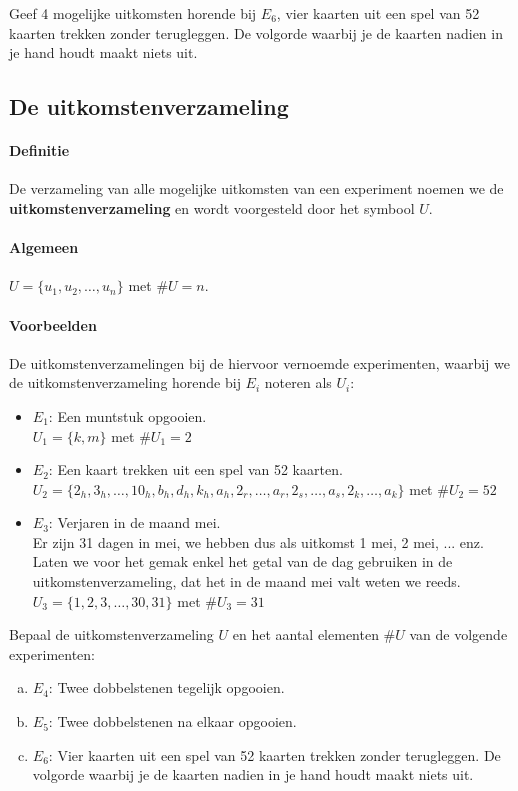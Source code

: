 \documentclass[12pt,twoside]{article}
\begin{document}
\begin{oefening}
Geef 4 mogelijke uitkomsten horende bij $E_6$, vier kaarten uit een spel van 52 kaarten trekken zonder terugleggen. De volgorde waarbij je de kaarten nadien in je hand houdt maakt niets uit.
\end{oefening}

\subsection{De uitkomstenverzameling}

\paragraph*{Definitie}
De verzameling van alle mogelijke uitkomsten van een experiment noemen we de
{\bf uitkomstenverzameling} en wordt voorgesteld door het symbool $U$.

\paragraph*{Algemeen}
$U=\{u_1, u_2, \ldots, u_n\}$ met $\#U=n$.

\paragraph*{Voorbeelden} De uitkomstenverzamelingen bij de hiervoor vernoemde experimenten, waarbij we de uitkomstenverzameling horende bij $E_i$ noteren als $U_i$:
\begin{itemize}
  \item $E_1$: Een muntstuk opgooien.\\
  $U_1 = \{k,m\}$ met $\#U_1=2$
  \item $E_2$: Een kaart trekken uit een spel van 52 kaarten.\\
  $U_2 = \{2_h, 3_h, \ldots , 10_h, b_h, d_h, k_h, a_h, 2_r, \ldots, a_r, 2_s, \ldots, a_s, 2_k, \ldots, a_k \}$ met $\#U_2=52$
  \item $E_3$: Verjaren in de maand mei.\\
  Er zijn 31 dagen in mei, we hebben dus als uitkomst 1 mei, 2 mei, ... enz. Laten we voor het gemak enkel het getal van de dag gebruiken in de uitkomstenverzameling, dat het in de maand mei valt weten we reeds.\\
  $U_3 = \{1, 2, 3, \ldots, 30, 31\}$ met $\#U_3=31$
\end{itemize}

\begin{oefening}
Bepaal de uitkomstenverzameling $U$ en het aantal elementen $\#U$ van de volgende experimenten:
\begin{enumerate}[(a)]
  \item $E_4$: Twee dobbelstenen tegelijk opgooien.
  \item $E_5$: Twee dobbelstenen na elkaar opgooien.
  \item $E_6$: Vier kaarten uit een spel van 52 kaarten trekken zonder terugleggen. De volgorde waarbij je de kaarten nadien in je hand houdt maakt niets uit.
\end{enumerate}
\end{oefening}
\end{document}
